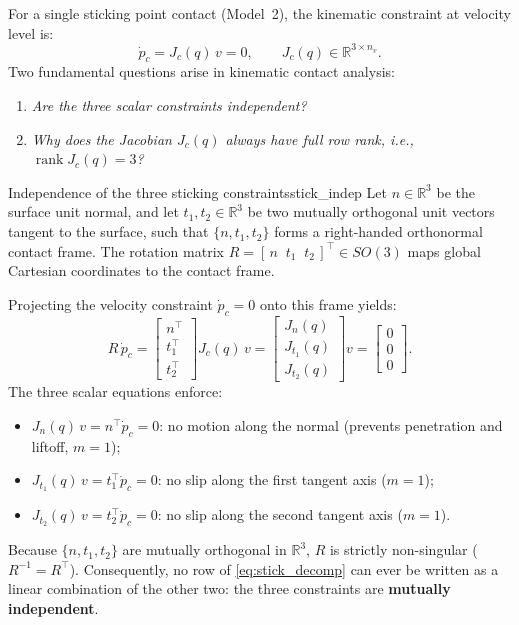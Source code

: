 \documentclass[11pt,a4paper]{article}
\newcommand{\R}{\mathbb{R}}
\DeclareMathOperator{\rank}{rank}
\begin{document}
For a single sticking point contact (Model~2), the kinematic constraint at velocity level is:
\begin{equation}\label{eq:single_stick}
  \dot p_c = J_c(q)\,v = 0, \qquad J_c(q) \in \R^{3 \times n_v}.
\end{equation}
Two fundamental questions arise in kinematic contact analysis:
\begin{enumerate}[nosep]
  \item \emph{Are the three scalar constraints independent?}
  \item \emph{Why does the Jacobian $J_c(q)$ always have full row rank, i.e., $\rank J_c(q) = 3$?}
\end{enumerate}

\begin{proposition}{Independence of the three sticking constraints}{stick_indep}
Let $n \in \R^3$ be the surface unit normal, and let $t_1, t_2 \in \R^3$ be two mutually orthogonal unit vectors tangent to the surface, such that $\{n, t_1, t_2\}$ forms a right-handed orthonormal contact frame. The rotation matrix $R = [\,n\;\; t_1\;\; t_2\,]^\top \in SO(3)$ maps global Cartesian coordinates to the contact frame.

Projecting the velocity constraint $\dot p_c = 0$ onto this frame yields:
\begin{equation}\label{eq:stick_decomp}
  R\,\dot p_c = \begin{bmatrix} n^\top \\ t_1^\top \\ t_2^\top \end{bmatrix} J_c(q)\,v = \begin{bmatrix} J_n(q) \\ J_{t_1}(q) \\ J_{t_2}(q) \end{bmatrix} v = \begin{bmatrix} 0 \\ 0 \\ 0 \end{bmatrix}.
\end{equation}
The three scalar equations enforce:
\begin{itemize}[nosep]
  \item $J_n(q)\,v = n^\top \dot p_c = 0$: no motion along the normal (prevents penetration and liftoff, $m=1$);
  \item $J_{t_1}(q)\,v = t_1^\top \dot p_c = 0$: no slip along the first tangent axis ($m=1$);
  \item $J_{t_2}(q)\,v = t_2^\top \dot p_c = 0$: no slip along the second tangent axis ($m=1$).
\end{itemize}
Because $\{n, t_1, t_2\}$ are mutually orthogonal in $\R^3$, $R$ is strictly non-singular ($R^{-1} = R^\top$). Consequently, no row of \eqref{eq:stick_decomp} can ever be written as a linear combination of the other two: the three constraints are \textbf{mutually independent}.
\end{proposition}
\end{document}
